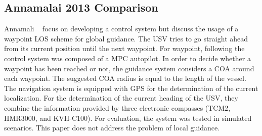     \subsection{Annamalai 2013 Comparison}
    Annamali \etal~\cite{Annamalai2013Comparison} focus on developing a control system but discuss the usage of a waypoint \ac{LOS} scheme \cite{Healey1993Multivariable} for global guidance. The \ac{USV} tries to go straight ahead from its current position until the next waypoint. For waypoint, following the control system was composed of a \ac{MPC} autopilot. In order to decide whether a waypoint has been reached or not, the guidance system considers a \ac{COA} around each waypoint. The suggested \ac{COA} radius is equal to the length of the vessel. The navigation system is equipped with \ac{GPS} for the determination of the current localization. For the determination of the current heading of the \ac{USV}, they combine the information provided by three electronic compasses (TCM2, HMR3000, and KVH-C100). For evaluation, the system was tested in simulated scenarios. This paper does not address the problem of local guidance.
    
